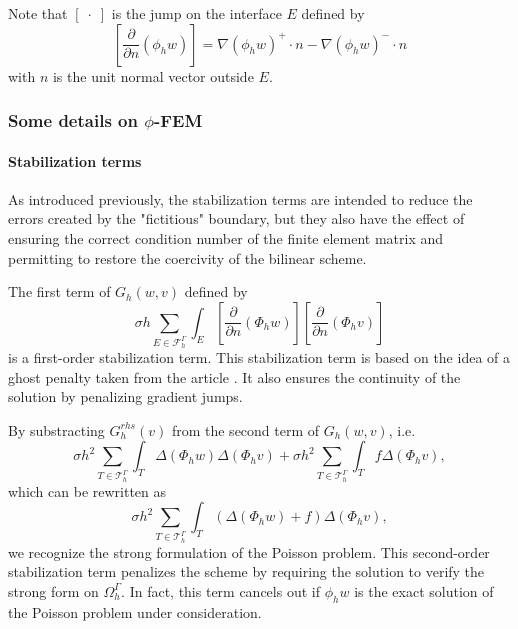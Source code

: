 \begin{Rem}
	Note that $[\;\cdot\;]$ is the jump on the interface $E$ defined by
	\begin{equation*}
		\left[\frac{\partial}{\partial n}(\phi_h w)\right]=\nabla(\phi_h w)^+\cdot n - \nabla(\phi_h w)^-\cdot n
	\end{equation*}
with $n$ is the unit normal vector outside $E$.
\end{Rem}

\subsubsection{Some details on $\phi$-FEM} \label{FEM.details}

\paragraph{Stabilization terms}    

As introduced previously, the stabilization terms are intended to reduce the errors created by the "fictitious" boundary, but they also have the effect of ensuring the correct condition number of the finite element matrix and permitting to restore the coercivity of the bilinear scheme.                                                                                      

The first term of $G_h(w,v)$ defined by
\begin{equation*}
	\sigma h\sum_{E\in\mathcal{F}_h^\Gamma} \int_E \left[\frac{\partial}{\partial n}(\Phi_h w)\right] \left[\frac{\partial}{\partial n}(\Phi_h v)\right]
\end{equation*}
is a first-order stabilization term. This stabilization term is based on the idea of a ghost penalty taken from the article . It also ensures the continuity of the solution by penalizing gradient jumps.

By substracting $G_h^{rhs}(v)$ from the second term of $G_h(w,v)$, i.e.
\begin{equation*}
	\sigma h^2\sum_{T\in\mathcal{T}_h^\Gamma} \int_{T} \Delta(\Phi_h w)\Delta(\Phi_h v)+\sigma h^2\sum_{T\in\mathcal{T}_h^\Gamma} \int_{T} f \Delta(\Phi_h v),
\end{equation*}
which can be rewritten as
\begin{equation*}
	\sigma h^2\sum_{T\in\mathcal{T}_h^\Gamma} \int_{T} \left(\Delta(\Phi_h w)+f\right)\Delta(\Phi_h v),
\end{equation*}
we recognize the strong formulation of the Poisson problem. This second-order stabilization term penalizes the scheme by requiring the solution to verify the strong form on $\Omega_h^\Gamma$. In fact, this term cancels out if $\phi_h w$ is the exact solution of the Poisson problem under consideration.

